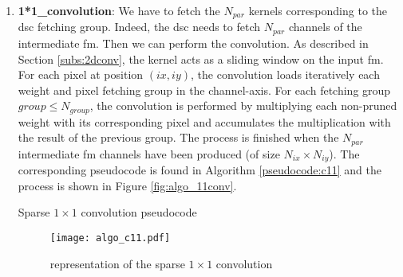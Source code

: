 %
%
%
\begin{enumerate}
    \item \textbf{1*1\_convolution}: We have to fetch the $N_{par}$ kernels corresponding to the \acrshort{dsc} fetching group. Indeed, the \acrshort{dsc} needs to fetch $N_{par}$ channels of the intermediate \acrshort{fm}. Then we can perform the convolution. As described in Section \ref{subs:2dconv}, the kernel acts as a sliding window on the input \acrshort{fm}. For each pixel at position $(ix, iy)$, the convolution loads iteratively each weight and pixel fetching group in the channel-axis. For each fetching group $group \leq N_{group}$, the convolution is performed by multiplying each non-pruned weight with its corresponding pixel and accumulates the multiplication with the result of the previous group. The process is finished when the $N_{par}$ intermediate \acrshort{fm} channels have been produced (of size $N_{ix} \times N_{iy}$). The corresponding pseudocode is found in Algorithm \ref{pseudocode:c11} and the process is shown in Figure \ref{fig:algo_11conv}.
    \begin{algorithm}[H]
        \centering
        \begin{algorithmic}
             
                 
                     
                         
                             
                            \EndFor
                        \EndFor
                    \EndFor
                \EndFor
            \EndFor
        \end{algorithmic}
        \caption{Sparse $1 \times 1$ convolution pseudocode}
        \label{pseudocode:c11}
    \end{algorithm}
    \begin{figure}[H]
        \centering
        \texttt{[image: algo\_c11.pdf]}
        \caption{representation of the sparse $1 \times 1$ convolution}

\end{figure}
\end{enumerate}
